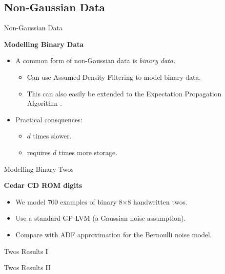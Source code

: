 \subsection{Non-Gaussian Data}

Non-Gaussian Data

{\textbf{Modelling Binary Data}}
\begin{itemize}
\item A common form of non-Gaussian data is \emph{binary data.}

\begin{itemize}
\item Can use Assumed Density Filtering to model binary data.
\item This can also easily be extended to the Expectation Propagation Algorithm
\cite{Minka:ep01}.
\end{itemize}
\item Practical consquences: 

\begin{itemize}
\item $d$ times slower.
\item requires $d$ times more storage.
\end{itemize}
\end{itemize}
Modelling Binary Twos

\textbf{Cedar CD ROM digits}
\begin{itemize}
\item We model 700 examples of binary 8$\times$8 handwritten twos.
\item Use a standard GP-LVM (a Gaussian noise assumption).
\item Compare with ADF approximation for the Bernoulli noise model.
\end{itemize}
Twos Results I

%
\begin{figure}
\begin{centering}
\hfill{}
\par\end{centering}

\caption{ }

\end{figure}


Twos Results II

